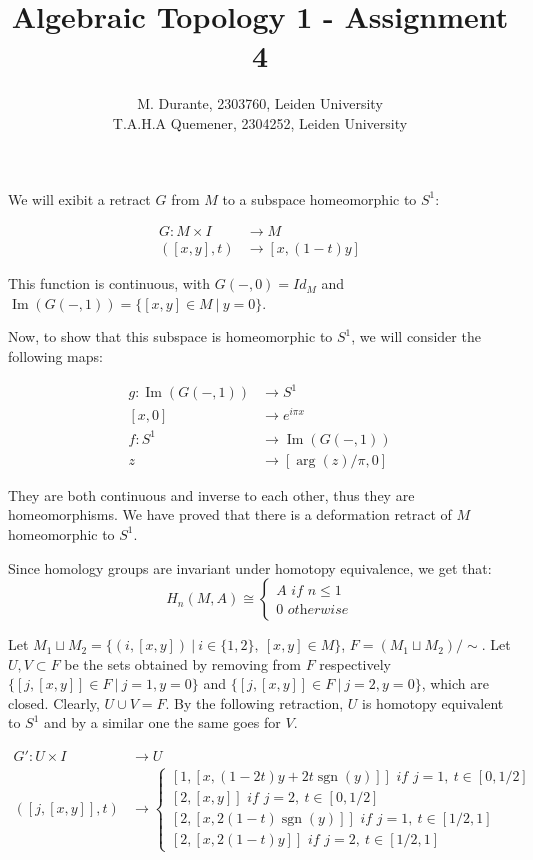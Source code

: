 \documentclass{article}
\DeclareMathOperator{\Ima}{Im}
\DeclareMathOperator{\sgn}{sgn}
\newcommand{\exercise}[1]{\noindent {\bf Exercise #1}}
\begin{document}
\title{Algebraic Topology 1 - Assignment 4}

\author{M. Durante, 2303760, Leiden University\\T.A.H.A Quemener, 2304252, Leiden University}

\maketitle


\exercise{1}

We will exibit a retract $G$ from $M$ to a subspace homeomorphic to $S^1$:

\begin{align*}
		G:M\times I & \rightarrow M \\
		([x,y],t) & \rightarrow [x,(1-t)y]
\end{align*}

This function is continuous, with $G(-,0)=Id_M$ and $\Ima(G(-,1))=\{[x,y]\in M\ |\ y=0\}$.

Now, to show that this subspace is homeomorphic to $S^1$, we will consider the following maps:

\begin{align*}
		g:\Ima(G(-,1)) & \rightarrow S^1 \\
		[x,0] & \rightarrow e^{i\pi x} \\
		f:S^1 & \rightarrow \Ima(G(-,1)) \\
		z & \rightarrow [\arg(z)/\pi,0]
\end{align*}

They are both continuous and inverse to each other, thus they are homeomorphisms. We have proved that there is a deformation retract of $M$ homeomorphic to $S^1$.

Since homology groups are invariant under homotopy equivalence, we get that:
$$H_n(M,A)\cong\begin{cases}
		A\textit{ if } n\leq 1 \\
		0\textit{ otherwise}
\end{cases}$$

Let $M_1\sqcup M_2=\{(i,[x,y])\ |\ i\in\{1,2\},\ [x,y]\in M\}$, $F=(M_1\sqcup M_2)/\sim$. Let $U,V\subset F$ be the sets obtained by removing from $F$ respectively $\{[j,[x,y]]\in F\ |\ j=1, y=0\}$ and $\{[j,[x,y]]\in F\ |\ j=2, y=0\}$, which are closed. Clearly, $U\cup V=F$. By the following retraction, $U$ is homotopy equivalent to $S^1$ and by a similar one the same goes for $V$.

\begin{align*}
		G':U\times I & \rightarrow U \\
		([j,[x,y]],t) & \rightarrow\begin{cases}
				[1,[x,(1-2t)y+2t\sgn(y)]]\textit{ if } j=1,\ t\in[0,1/2] \\
				[2,[x,y]]\textit{ if } j=2,\ t\in[0,1/2] \\
				[2,[x,2(1-t)\sgn(y)]]\textit{ if } j=1,\ t\in[1/2,1] \\
				[2,[x,2(1-t)y]]\textit{ if } j=2,\ t\in[1/2,1]
		\end{cases}
\end{align*}
\end{document}
